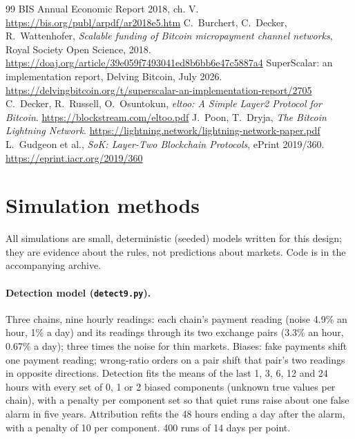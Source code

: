 \begin{thebibliography}{99}
 BIS Annual Economic Report 2018, ch. V. \url{https://bis.org/publ/arpdf/ar2018e5.htm}
 C.~Burchert, C.~Decker, R.~Wattenhofer, \emph{Scalable funding of Bitcoin micropayment channel networks}, Royal Society Open Science, 2018. \url{https://doaj.org/article/39e059f7493041ed8b6bb6e47c5887a4}
 SuperScalar: an implementation report, Delving Bitcoin, July 2026. \url{https://delvingbitcoin.org/t/superscalar-an-implementation-report/2705}
 C.~Decker, R.~Russell, O.~Osuntokun, \emph{eltoo: A Simple Layer2 Protocol for Bitcoin}. \url{https://blockstream.com/eltoo.pdf}
 J.~Poon, T.~Dryja, \emph{The Bitcoin Lightning Network}. \url{https://lightning.network/lightning-network-paper.pdf}
 L.~Gudgeon et al., \emph{SoK: Layer-Two Blockchain Protocols}, ePrint 2019/360. \url{https://eprint.iacr.org/2019/360}
\end{thebibliography}

\appendix
\section{Simulation methods}\label{app:sims}

All simulations are small, deterministic (seeded) models written for this design; they are evidence about the rules, not predictions about markets. Code is in the accompanying archive.

\paragraph{Detection model (\texttt{detect9.py}).} Three chains, nine hourly readings: each chain's payment reading (noise 4.9\% an hour, 1\% a day) and its readings through its two exchange pairs (3.3\% an hour, 0.67\% a day); three times the noise for thin markets. Biases: fake payments shift one payment reading; wrong-ratio orders on a pair shift that pair's two readings in opposite directions. Detection fits the means of the last 1, 3, 6, 12 and 24 hours with every set of 0, 1 or 2 biased components (unknown true values per chain), with a penalty per component set so that quiet runs raise about one false alarm in five years. Attribution refits the 48 hours ending a day after the alarm, with a penalty of 10 per component. 400 runs of 14 days per point.

